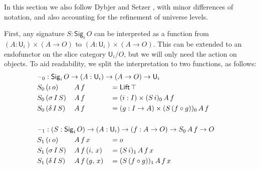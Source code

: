 \documentclass[acmsmall,screen,review,anonymous]{acmart}
\newcommand{\msf}[1]{{\mathsf{#1}}}
\newcommand{\U}{\msf{U}}
\newcommand{\Lift}{\msf{Lift}}
\newcommand{\Sig}{\msf{Sig}}
\newcommand{\blank}{{\mathord{\hspace{1pt}\text{--}\hspace{1pt}}}}
\begin{document}
In this section we also follow Dybjer and Setzer \cite{TODO}, with minor differences of notation, and
also accounting for the refinement of universe levels.

First, any signature $S : \Sig_i\,O$ can be interpreted as a function from $(A : \U_i) \times (A \to O)$
to $(A : \U_i) \times (A \to O)$. This can be extended to an endofunctor on the slice category $\U_i/O$,
but we will only need the action on objects. To aid readability, we split the interpretation to two functions,
as follows:
\begin{alignat*}{3}
  &\hspace{-1em}\rlap{$\blank_0 : \Sig_i\,O \to (A : \U_i) \to (A \to O) \to \U_i$} \\
  &\hspace{-1em}S_0\,(\iota\,o)    \,&&A\,f && = \Lift\,\top\\
  &\hspace{-1em}S_0\,(\sigma\,I\,S)\,&&A\,f && = (i : I) \times (S\,i)_0\,A\,f\\
  &\hspace{-1em}S_0\,(\delta\,I\,S)\,&&A\,f && = (g : I \to A) \times (S\,(f \circ g))_0\,A\,f\\
  &\hspace{-1em} && &&\\
  &\hspace{-1em}\rlap{$\blank_1 : (S : \Sig_i\,O) \to (A : \U_i) \to (f : A \to O) \to S_0\,A\,f \to O$} \\
  &\hspace{-1em}S_1\,(\iota\,o)    \,&&A\,f\,x       && = o\\
  &\hspace{-1em}S_1\,(\sigma\,I\,S)\,&&A\,f\,(i,\,x) && = (S\,i)_1\,A\,f\,x\\
  &\hspace{-1em}S_1\,(\delta\,I\,S)\,&&A\,f\,(g,\,x) && = (S\,(f \circ g))_1\,A\,f\,x
\end{alignat*}





\end{document}
